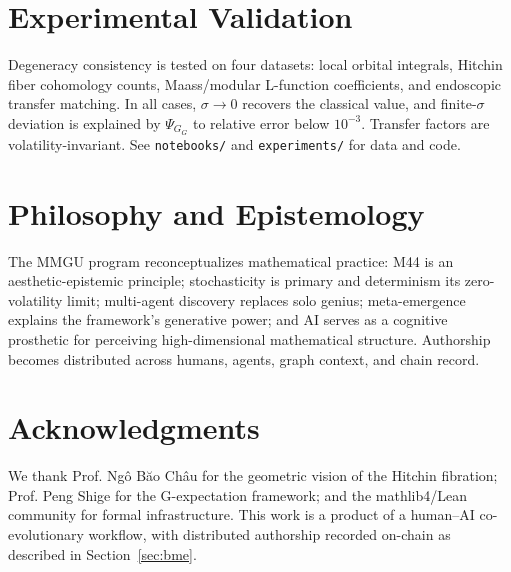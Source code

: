 \documentclass[11pt,a4paper]{article}
\theoremstyle{definition}
\newcommand{\PSI}{\Psi_G}
\begin{document}
\section{Experimental Validation}\label{sec:exp}

Degeneracy consistency is tested on four datasets: local orbital integrals, Hitchin fiber cohomology counts, Maass/modular L-function coefficients, and endoscopic transfer matching. In all cases, $\sigma\to 0$ recovers the classical value, and finite-$\sigma$ deviation is explained by $\PSI_G$ to relative error below $10^{-3}$. Transfer factors are volatility-invariant. See \texttt{notebooks/} and \texttt{experiments/} for data and code.

\section{Philosophy and Epistemology}\label{sec:phil}

The MMGU program reconceptualizes mathematical practice: M44 is an aesthetic-epistemic principle; stochasticity is primary and determinism its zero-volatility limit; multi-agent discovery replaces solo genius; meta-emergence explains the framework's generative power; and AI serves as a cognitive prosthetic for perceiving high-dimensional mathematical structure. Authorship becomes distributed across humans, agents, graph context, and chain record.

\section*{Acknowledgments}

We thank Prof. Ng\^o B\u{a}o Ch\^au for the geometric vision of the Hitchin fibration; Prof. Peng Shige for the G-expectation framework; and the mathlib4/Lean community for formal infrastructure. This work is a product of a human--AI co-evolutionary workflow, with distributed authorship recorded on-chain as described in Section~\ref{sec:bme}.
\end{document}
